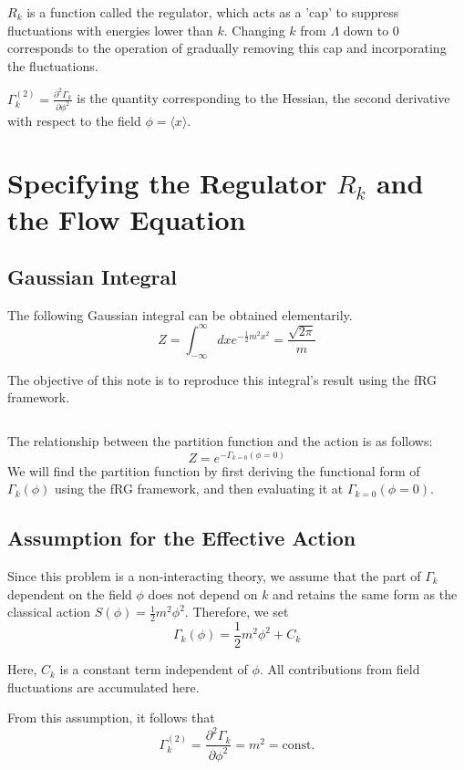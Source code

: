 \documentclass[uplatex,a4j,12pt,dvipdfmx]{jsarticle}
\begin{document}
$R_{k}$ is a function called the regulator,
which acts as a 'cap' to suppress fluctuations with energies lower than $k$.
Changing $k$ from $\Lambda$ down to $0$ corresponds to the operation
of gradually removing this cap and incorporating the fluctuations.

$\Gamma^{(2)}_{k} = \frac{\partial^{2} \Gamma_{k}}{\partial \phi^{2}}$
is the quantity corresponding to the Hessian,
the second derivative with respect to the field $\phi = \langle x \rangle$.

\section{Specifying the Regulator $R_{k}$ and the Flow Equation}

\subsection{Gaussian Integral}

The following Gaussian integral can be obtained elementarily.
\[
    Z =
    \int^{\infty}_{- \infty} dx e^{ -\frac{1}{2} m^{2} x^{2} }
    =
    \frac{ \sqrt{2 \pi} }{ m }
\]

The objective of this note is to reproduce this integral's result using the fRG framework.

${}$

The relationship between the partition function and the action is as follows:
\[
    Z = e^{-\Gamma_{k=0}(\phi=0)}
\]
We will find the partition function by first deriving the functional form of $\Gamma_{k} (\phi)$
using the fRG framework, and then evaluating it at $\Gamma_{k=0}(\phi=0)$.

\subsection{Assumption for the Effective Action}

Since this problem is a non-interacting theory,
we assume that the part of $\Gamma_k$ dependent on the field $\phi$ does not depend on $k$
and retains the same form as the classical action $S(\phi)=\frac{1}{2} m^{2} \phi^{2}$.
Therefore, we set
\[
    \Gamma_{k} (\phi) = \frac{1}{2} m^{2} \phi^{2} + C_{k}
\]

Here, $C_k$ is a constant term independent of $\phi$.
All contributions from field fluctuations are accumulated here.

From this assumption, it follows that
\[
    \Gamma^{(2)}_{k}
    =
    \frac{\partial^{2} \Gamma_{k}}{\partial \phi^{2}}
    =
    m^{2}
    =
    \mathrm{const.}
\]
\end{document}
